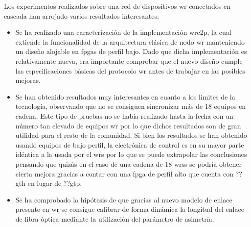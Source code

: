 Los experimentos realizados sobre una red de dispositivos \gls{wr} conectados 
en cascada han arrojado varios resultados interesantes:

\begin{itemize}
	\item Se ha realizado una caracterización de la implementación \gls{wrc2p}, 
	la cual extiende la funcionalidad de la arquitectura clásica de nodo 
	\gls{wr} manteniendo un diseño alojable en \gls{fpga}s de perfil bajo. Dado 
	que dicha implementación es relativamente nueva, era importante comprobar 
	que el nuevo diseño cumple las especificaciones básicas del protocolo  
	\gls{wr} antes de trabajar en las posibles mejoras.
	
	\item Se han obtenido resultados muy interesantes en cuanto a los límites 
	de la tecnología, observando que no se consiguen sincronizar más de 18 
	equipos en cadena. Este tipo de pruebas no se había realizado hasta la 
	fecha con un número tan elevado de equipos \gls{wr} por lo que dichos 
	resultados son de gran utilidad para el resto de la comunidad. Si bien los 
	resultados se han obtenido usando equipos de bajo perfil, la electrónica de 
	control es en su mayor parte idéntica a la usada por el \gls{wrs} por lo 
	que se puede extrapolar las conclusiones pensando que quizás en el caso de 
	una cadena de 18 \gls{wrs}s se podría obtener cierta mejora gracias a 
	contar con una \gls{fpga} de perfil alto que cuenta con ??gth en lugar 
	de ??gtp.
	
	\item Se ha comprobado la hipótesis de que gracias al nuevo modelo de 
	enlace presente en \gls{wr} se consigue calibrar de forma dinámica la 
	longitud del enlace de fibra óptica mediante la utilización del parámetro 
	de asimetría.
\end{itemize}

